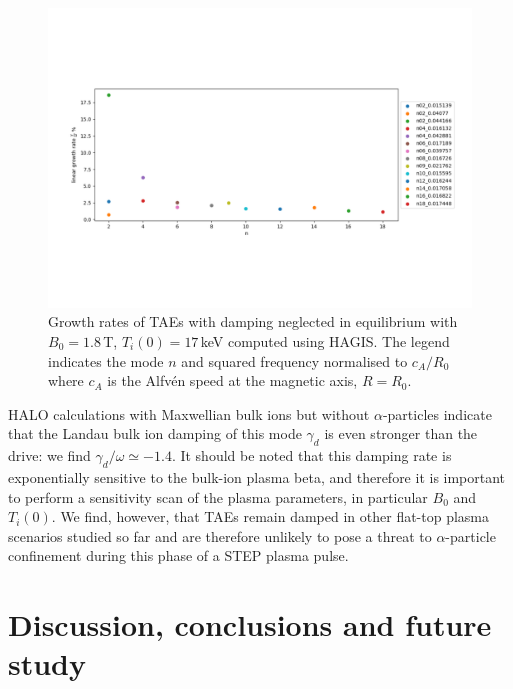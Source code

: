 \documentclass[10pt, a4paper, twoside]{article}
\begin{document}
\begin{figure}[!htb]
    \centering
    \vskip -3.0cm
    \includegraphics[width=1.0\linewidth]{Figures/TAE_figure.pdf}
    \vskip -3.0cm
    \caption{Growth rates of TAEs with damping neglected in equilibrium with $B_0 = 1.8\,$T, $T_i(0) = 17\,$keV computed using HAGIS. The legend indicates the mode $n$ and squared frequency normalised to $c_A/R_0$ where $c_A$ is the Alfv\'en speed at the magnetic axis, $R=R_0$.}
    \label{fig:TAEs}
\end{figure}

HALO calculations with Maxwellian bulk ions but without $\alpha$-particles indicate that the Landau bulk ion damping of this mode $\gamma_d$ is even stronger than the drive: we find $\gamma_d/\omega \simeq -1.4$. It should be noted that this damping rate is exponentially sensitive to the bulk-ion plasma beta, and therefore it is important to perform a sensitivity scan of the plasma parameters, in particular $B_0$ and $T_i(0)$. We find, however, that TAEs remain damped in other flat-top plasma scenarios studied so far and are therefore unlikely to pose a threat to $\alpha$-particle confinement during this phase of a STEP plasma pulse.        

\section{Discussion, conclusions and future study}
\label{sec:discussion_and_conclusions}
\end{document}
